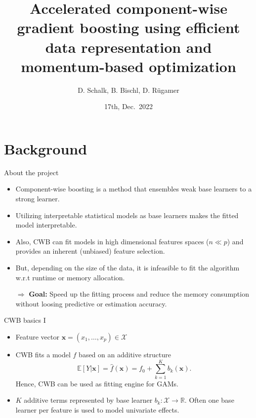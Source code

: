 \documentclass[ignorenonframetext,]{beamer}
\title{Accelerated component-wise gradient boosting using efficient data
representation and momentum-based optimization}
\author{D. Schalk, B. Bischl, D. Rügamer}
\date{17th, Dec.~2022}
\providecommand{\tightlist}{%
  \setlength{\itemsep}{0pt}\setlength{\parskip}{0pt}}
\newcommand{\fh}{\hat{f}}
\begin{document}
\begin{frame}[plain]
\titlepage
\end{frame}


\hypertarget{background}{%
\section{Background}\label{background}}

\begin{frame}{About the project}
\protect\hypertarget{about-the-project}{}
\begin{itemize}
\tightlist
\item
  Component-wise boosting
  \citep[CWB;][]{buhlmann2003boosting,buhlmann2007boosting} is a method
  that ensembles weak base learners to a strong learner.
\item
  Utilizing interpretable statistical models as base learners makes the
  fitted model interpretable.
\item
  Also, CWB can fit models in high dimensional features spaces
  (\(n \ll p\)) and provides an inherent (unbiased) feature selection.
\item
  But, depending on the size of the data, it is infeasible to fit the
  algorithm w.r.t runtime or memory allocation.
\end{itemize}

\begin{itemize}
\item[$\Rightarrow$] \textbf{Goal:} Speed up the fitting process and reduce the memory consumption without loosing predictive or estimation accuracy.
\end{itemize}
\end{frame}

\begin{frame}{CWB basics I}
\protect\hypertarget{cwb-basics-i}{}
\begin{itemize}
\tightlist
\item
  Feature vector \(\bm{x} = (x_1, \dots, x_p)\in\mathcal{X}\)
\item
  CWB fits a model \(\fh\) based on an additive structure
  \[\mathbb{E}[Y|\bm{x}] = \fh(\bm{x}) = f_0 + \sum_{k=1}^K b_k(\bm{x}).\]
  Hence, CWB can be used as fitting engine for GAMs.
\item
  \(K\) additive terms represented by base learner
  \(b_k : \mathcal{X} \to \mathbb{R}\). Often one base learner per
  feature is used to model univariate effects.
\end{itemize}
\end{frame}
\end{document}
